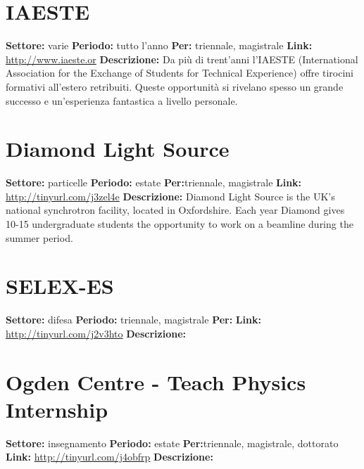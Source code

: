 \documentclass[a4paper,10pt]{article}
\begin{document}
\section{IAESTE}
\textbf{Settore:} varie\newline
\textbf{Periodo:} tutto l'anno\newline
\textbf{Per:} triennale, magistrale\newline
\textbf{Link:} \url{http://www.iaeste.or} \newline
\textbf{Descrizione:} Da più di trent'anni l'IAESTE (International Association for the Exchange of Students for Technical Experience) offre tirocini formativi  all'estero retribuiti. Queste opportunità si rivelano spesso un grande successo e un'esperienza fantastica a livello personale.  

\section{Diamond Light Source}
\textbf{Settore:} particelle\newline
\textbf{Periodo:} estate\newline
\textbf{Per:}triennale, magistrale\newline
\textbf{Link:} \url{http://tinyurl.com/j3zel4e} \newline
\textbf{Descrizione:} Diamond Light Source is the UK's national synchrotron facility, located in Oxfordshire. Each year Diamond gives 10-15 undergraduate students the opportunity to work on a beamline during the summer period.  

 \section{SELEX-ES}
 \textbf{Settore:} difesa \newline
\textbf{Periodo:} triennale, magistrale\newline
\textbf{Per:}\newline
\textbf{Link:} \url{http://tinyurl.com/j2v3hto} \newline
\textbf{Descrizione:} 

\section{Ogden Centre - Teach Physics Internship}
\textbf{Settore:} insegnamento\newline
\textbf{Periodo:} estate\newline
\textbf{Per:}triennale, magistrale, dottorato\newline
\textbf{Link:} \url{http://tinyurl.com/j4obfrp} \newline
\textbf{Descrizione:} 
\end{document}
